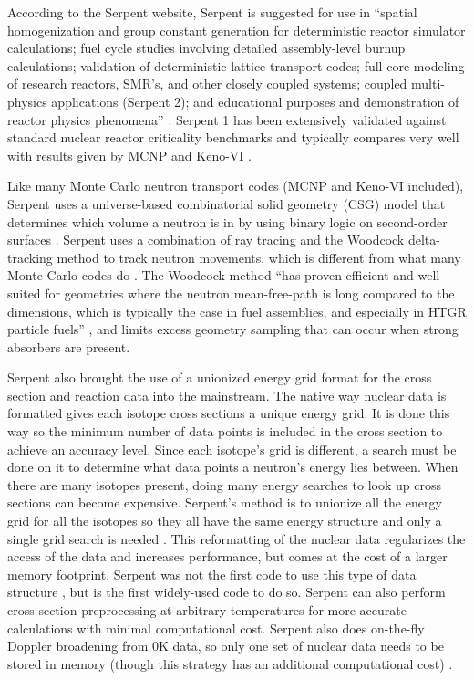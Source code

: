  According to the Serpent website, Serpent is suggested for use in ``spatial homogenization and group constant generation for deterministic reactor simulator calculations; fuel cycle studies involving detailed assembly-level burnup calculations; validation of deterministic lattice transport codes; full-core modeling of research reactors, SMR's, and other closely coupled systems; coupled multi-physics applications (Serpent 2);  and educational purposes and demonstration of reactor physics phenomena'' \cite{serpent}.  Serpent 1 has been extensively validated against standard nuclear reactor criticality benchmarks and typically compares very well with results given by MCNP and Keno-VI \cite{serpent}.

Like many Monte Carlo neutron transport codes (MCNP and Keno-VI included), Serpent uses a universe-based combinatorial solid geometry (CSG) model that determines which volume a neutron is in by using binary logic on second-order surfaces \cite{mcnp, serpent}.  Serpent uses a combination of ray tracing and the Woodcock delta-tracking method to track neutron movements, which is different from what many Monte Carlo codes do \cite{serpent}.  
The Woodcock method ``has proven efficient and well suited for geometries where the neutron mean-free-path is long compared to the dimensions, which is typically the case in fuel assemblies, and especially in HTGR particle fuels'' \cite{serpent}, and limits excess geometry sampling that can occur when strong absorbers are present.

Serpent also brought the use of a unionized energy grid format for the cross section and reaction data into the mainstream.  The native way nuclear data is formatted gives each isotope cross sections a unique energy grid.  It is done this way so the minimum number of data points is included in the cross section to achieve an accuracy level.  Since each isotope's grid is different, a search must be done on it to determine what data points a neutron's energy lies between.  When there are many isotopes present, doing many energy searches to look up cross sections can become expensive.  Serpent's method is to unionize all the energy grid for all the isotopes so they all have the same energy structure and only a single grid search is needed \cite{jaakko}. 
  This reformatting of the nuclear data regularizes the access of the data and increases performance, but comes at the cost of a larger memory footprint.  Serpent was not the first code to use this type of data structure \cite{vector}, but is the first widely-used code to do so.  Serpent can also perform cross section preprocessing at arbitrary temperatures for more accurate calculations with minimal computational cost. Serpent also does on-the-fly Doppler broadening from 0K data, so only one set of nuclear data needs to be stored in memory (though this strategy has an additional computational cost) \cite{serpent}.

